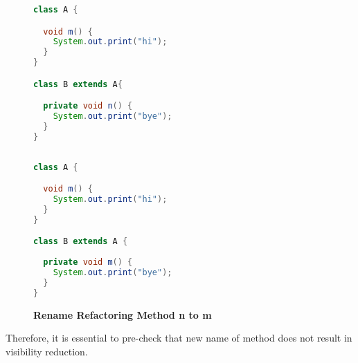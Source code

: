 \begin{figure}[th]
\centering
\begin{minipage}[t]{0.47\linewidth}
\begin{lstlisting}[language=java, basicstyle=\scriptsize\ttfamily,frame=single]
class A {

  void m() {
    System.out.print("hi");
  }
}

class B extends A{

  private void n() {
    System.out.print("bye");
  }	
}
 
\end{lstlisting}
\end{minipage}
\hfill
\begin{minipage}[t]{0.47\linewidth}
\begin{lstlisting}[language=java, basicstyle=\scriptsize\ttfamily,frame=single]
class A {

  void m() {
    System.out.print("hi");
  }
}

class B extends A {
 
  private void m() {
    System.out.print("bye");
  }	
}

\end{lstlisting}
\end{minipage}
\caption{\textbf{Rename Refactoring Method n to m}}
\label{fig:RmR3}
\end{figure}

Therefore, it is essential to pre-check that new name of method does not result in visibility reduction. 

